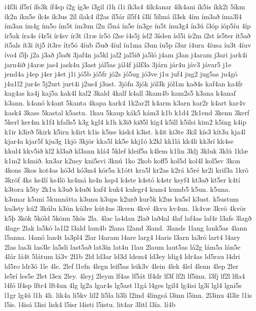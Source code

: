 {í4f3i
íf5rí
ífs3k
íf4sp
í2g
íg3e
í3gil
í1h
í1i
ík3a4
4ík4anar
4ík4ani
ík5is
íkk2i
5íkm
ík2n
íkn5e
ík4s
ík3us
2íl
ílak4
íl2as
íl5ár
íl5f4
í3lí
5ílmá
íl3sk
4ím
ím3að
íma3l4
ím3an
ím4g
ím5o
ím5t
ím3un
í2n
í5ná
ín5e
ín3ge
ín5t
ínu3g4
ín3ú
í3óp
íóp5íu
4íp
ír5ak
íra4s
í4r5i
ír4sv
ír3t
í1ræ
ír5ö
í2se
í4s5j
ísl2
3íslen
ísl5i
ís2m
í2st
ís5ter
ít5að
ít5als
ít3i
ítj5
ít3re
ítr5ó
4íub
í5uð
4íul
íu1ma
í3un
íu5p
í3ur
í4ura
4íusa
íu3t
4íuv
ívo4
í5þ
j2a
j3að
j5aði
3jaf4n
ja5kl
jal2
jal5ið
ja5ló
j4am
j3an
j4aram
j3ari
jark4i
jarn4ið
j4aræ
jas4
jask4u
j3ast
jál5as
jál4f
jálf3a
3járn
jár4u
jáv3
jávar5
j1e
jend4a
j4ep
j4er
j4et
j1i
jó5b
jó5fr
jó2s
jó5ug
jó3ve
j1u
juf4
jug2
jug5as
ju4gó
j4u1l2
jur4e
5j2urt
jurt4i
j2us4
j3ust.
3jöfn
3jök
jöl3k
jöl1m
kað4s
kaf4an
ka4fr
kag4as
ka4j
kaj5a
kak4l
kal2
3kald
4kalf
k4all
3kam4b
kam2s5
k3ana
k4anaf
k3ann.
k4anó
k4ant
5kanta
4kapa
kark4
1k2ar2l
k4arm
k3arn
kar2r
k4art
kar4v
kask4
3kass
5kastal
k5astu.
1kau
5kaup
kák5
kám3
k1b
k1d4
2k1end
3kenn
3kerf
5kerl
ker4m
k1f4
kfalls5
k3g
kgl4
k1h
k3ið
kið5l
kig4
k5ill
k5ilsi
kim2
k5ing
k4ip
k1ir
k3irð
5kirk
k5irn
k4irt
k1is
k5ise
kisk4
k3ist.
k4it
ki3te
3kíl
kís3
kít3u
kja4l
kjar4a
kjar5f
kju3g
1kjö
3kjör
kka5l
kk5e
kkj1ó
k2kl
kk1lá
kk4li
kk3rí
kk4se
kkul4
kkv5ið
kl2
kl3að
kl3ann
klá4
5klef
kleif5a
k4lem
k1lin
3klj
3kluk
3klú
1klæ
k1m2
k4mið.
kn3ar
k2ney
kni5svi
3knú
1ko
2kob
koff5
kol5d
kol4l
kol5sv
3kon
4kons
3kos
kot4as
kó3d
kó3m4
kór5a
k1ótt
kra5l
kr2as
k2rá
k5ré
kr2i
krif3a
1krö
3kröf
4ks
ks4lí
ks4lö
ks4má
ks4n
ksp4
k4ste
k4stó
k4str
ksyf4
kt3að
kt5er
k4tí
k3tora
k5ty
2k1u
k3uð
k4uði
kuf4
kuk4
kulegr4
kum4
kumb5
k5un.
k5una.
k3unar
k5uni
5kunnátta
k3unu
k3ups
k2urð
kur5k
k2us
ku5sl
k3ust.
k5ustum
ku3sty
kú2
3kúlu
k3ún
kú3re
kút4us
3kven
4kvé
4kvu
kv4un.
1k4væ
3kvö
4kvör
k5þ
3kök
5köld
5könn
5kös
2la.
4lac
la4dan
2lað
lað4al
4laf
laf4as
laf4r
l3afs
3lagð
4lage
2lak
la5kó
la1l2
l3ald
lam4b
2lana
l2and
3land.
3lands
1lang
lank5as
4lann
l5anna.
l4anó
lan4t
la3pl4
2lar
l4aram
l4are
larg4
l4aris
l3arn
la3ró
lart4
l4ary
2las
las3i
las3le
la5sli
last5að
lat3ín
lat4u
1lau
2laum
laut5as
lá2g
lám5a
lán5e
4lár
lá4t
5látum
lá3v
2l1b
2ld
ld3ar
ld3d
ldem4
ld3ey
ldig4
ldr4as
ld5rau
l4dri
ld5ro
ldr3ó
1le
4le.
2lef
l1efn
4legn
leif5as
leik3v
4lein
4lek
4lel
4lenn
4lep
2ler
le5rí
les5e
2let
l3ex
2ley.
4leyj
2leym
lf4as
lf5át
lf4dr
lf3f
lf2i
lf5inn.
l3fj
lf2l
lfla4
l4fó
lf4sp
lftr4
lft4un
4lg
lg2a
lgar4s
lg5ast
l1gá
l4ges
lgil4
lg4isi
lg3í
lgl4
lgni5s
l1gr
lg4ú
l1h
4li.
lik4a
li5kv
lil2
li5la
li3li
l2ind
4lingsá
l3inn
l5inn.
2l3inu
4l3ir
l1is
l5is.
l4isá
l3isi
lisk4
l5isr
l4isti
l5istu.
lit4ar
3litl
l3ía.
lí4b
}
